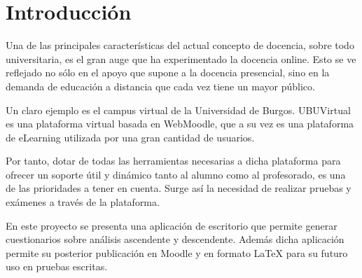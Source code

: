 
\section{Introducción}

Una de las principales características del actual concepto de docencia, sobre todo universitaria, es el gran auge que ha experimentado la docencia online. Esto se ve reflejado no sólo en el apoyo que supone a la docencia presencial, sino en la demanda de educación a distancia que cada vez tiene un mayor público.

Un claro ejemplo es el campus virtual de la Universidad de Burgos. UBUVirtual es una plataforma virtual basada en WebMoodle, que a su vez es una plataforma de eLearning utilizada por una gran cantidad de usuarios.

Por tanto, dotar de todas las herramientas necesarias a dicha plataforma para ofrecer un soporte útil y dinámico tanto al alumno como al profesorado, es una de las prioridades a tener en cuenta. Surge así la necesidad de realizar pruebas y exámenes a través de la plataforma.

En este proyecto se presenta una aplicación de escritorio que permite generar cuestionarios sobre análisis ascendente y descendente. Además dicha aplicación permite su posterior publicación en Moodle y en formato \LaTeX{} para su futuro uso en pruebas escritas.














